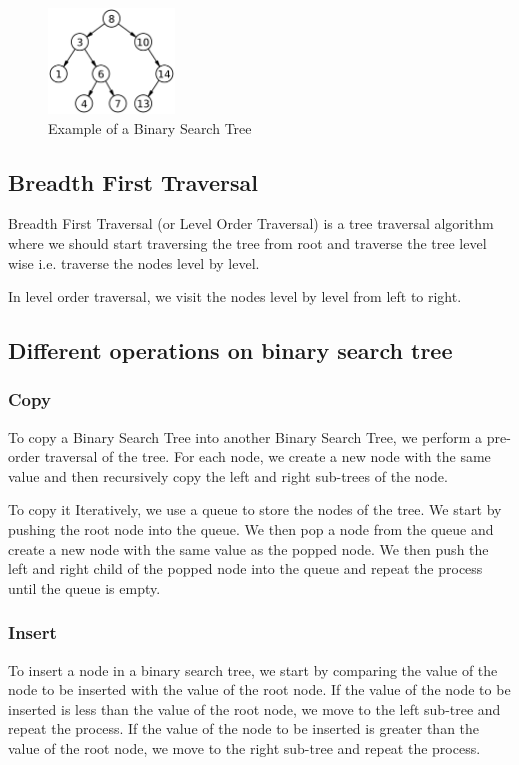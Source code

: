 \documentclass[11pt]{article}
\begin{document}
\begin{figure}[H]
	\centering
	\includegraphics[width=0.30\textwidth]{figures/1200px-Binary_search_tree.svg.png}
	\caption{Example of a Binary Search Tree}
	\label{fig:1200px-Binary_search_tree.svg}
\end{figure}

\subsection{Breadth First Traversal}
Breadth First Traversal (or Level Order Traversal) is a tree traversal algorithm where we should start traversing the tree from root and traverse the tree level wise i.e. traverse the nodes level by level.

In level order traversal, we visit the nodes level by level from left to right.

\subsection{Different operations on binary search tree}

\subsubsection{Copy}
To copy a Binary Search Tree into another Binary Search Tree, we perform a pre-order traversal of the tree. For each node, we create a new node with the same value and then recursively copy the left and right sub-trees of the node.

To copy it Iteratively, we use a queue to store the nodes of the tree. We start by pushing the root node into the queue. We then pop a node from the queue and create a new node with the same value as the popped node. We then push the left and right child of the popped node into the queue and repeat the process until the queue is empty.

\subsubsection{Insert}
To insert a node in a binary search tree, we start by comparing the value of the node to be inserted with the value of the root node. If the value of the node to be inserted is less than the value of the root node, we move to the left sub-tree and repeat the process. If the value of the node to be inserted is greater than the value of the root node, we move to the right sub-tree and repeat the process.
\end{document}
